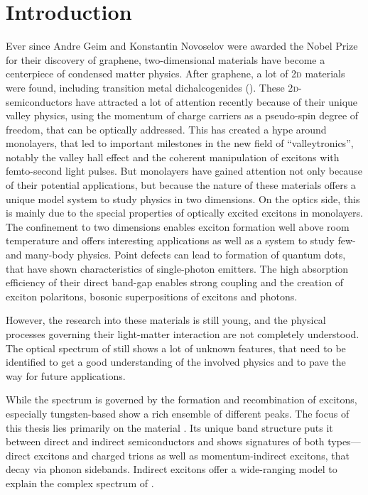 \chapter{Introduction}
Ever since Andre Geim and Konstantin Novoselov were awarded the Nobel Prize for their discovery of graphene, two-dimensional materials have become a centerpiece of condensed matter physics\cite{novoselov_electric_2004}. After graphene, a lot of 2\textsc{d} materials were found, including transition metal dichalcogenides (\tmds\!). These 2\textsc{d}-semiconductors have attracted a lot of attention recently because of their unique valley physics, using the momentum of charge carriers as a pseudo-spin degree of freedom, that can be optically addressed\cite{wang_electronics_2012}. This has created a hype around \tmdg monolayers, that led to important milestones in the new field of ``valleytronics'', notably the valley hall effect\cite{mak_valley_2014} and the coherent manipulation of excitons with femto-second light pulses\cite{langer_lightwave_2018}. But \tmdg monolayers have gained attention not only because of their potential applications, but because the nature of these materials offers a unique model system to study physics in two dimensions. On the optics side, this is mainly due to the special properties of optically excited excitons in \tmdg monolayers. The confinement to two dimensions enables exciton formation well above room temperature and offers interesting applications as well as a system to study few- and many-body physics\cite{chernikov_exciton_2014}. Point defects can lead to formation of quantum dots, that have shown characteristics of single-photon emitters\cite{srivastava_optically_2015}. The high absorption efficiency of their direct band-gap enables strong coupling and the creation of exciton polaritons, bosonic superpositions of excitons and photons\cite{liu_control_2017,zhang_photonic-crystal_2018}.

However, the research into these materials is still young, and the physical processes governing their light-matter interaction are not completely understood\cite{koperski_optical_2017}. The optical spectrum of \tmds still shows a lot of unknown features, that need to be identified to get a good understanding of the involved physics and to pave the way for future applications. 

While the spectrum is governed by the formation and recombination of excitons, especially tungsten-based \tmds show a rich ensemble of different peaks. The focus of this thesis lies primarily on the material \wse\!. Its unique band structure puts it between direct and indirect semiconductors and shows signatures of both types---direct excitons and charged trions as well as momentum-indirect excitons, that decay via phonon sidebands. Indirect excitons offer a wide-ranging model to explain the complex spectrum of \wse\!. 

